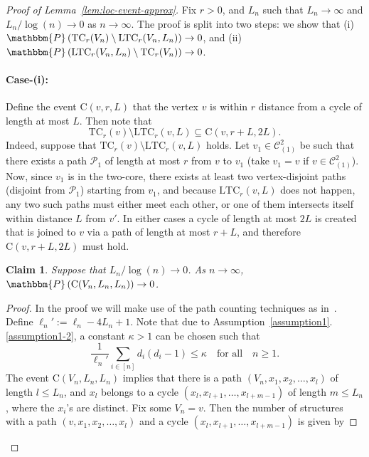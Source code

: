 \documentclass[11pt,a4paper, reqno]{article}
\numberwithin{equation}{section}
\numberwithin{equation}{section}
\def\sss{\scriptscriptstyle}
\newcommand{\prob}[1]{\ensuremath{\mathbbm{P}\left(#1\right)}}
\newcommand{\1}{\ensuremath{\mathbbm{1}}}
\newcommand{\TC}{\mathrm{TC}}
\newcommand{\LTC}{\mathrm{LTC}}
\newtheorem{claim}{Claim}
\newenvironment{claimproof}{\begin{proof}\renewcommand{\qedsymbol}{\claimqed}}{\end{proof}\renewcommand{\qedsymbol}{\plainqed}}
\let\plainqed\qedsymbol
\newcommand{\claimqed}{$\lrcorner$}
\numberwithin{equation}{section}
\numberwithin{theorem}{section}
\begin{document}
\begin{proof}[{Proof of Lemma~\ref{lem:loc-event-approx}}]
Fix $r>0$, and $L_n$ such that $L_n\to\infty$ and $L_n/\log(n)\to 0$ as $n\to\infty.$
The proof is split into two steps: we show that
(i) $\prob{\TC_r(V_n)\setminus \LTC_r(V_n,L_n)} \to 0$, and
(ii)~$\prob{\LTC_r(V_n,L_n)\setminus \TC_r(V_n)} \to 0$.
\paragraph*{Case-(i):} Define the event $\mathrm{C}(v,r,L)$ that the vertex $v$ is within $r$ distance from a cycle of length at most $L$.
Then note that 
$$\mathrm{TC}_r(v)\setminus \mathrm{LTC}_r(v,L)\subseteq \mathrm{C}(v,r+L,2L).$$
Indeed, suppose that $\mathrm{TC}_r(v)\setminus \mathrm{LTC}_r(v,L)$ holds. 
Let $v_1\in \mathscr{C}_{\sss (1)}^2$ be such that there exists a path $\mathcal{P}_1$ of length at most $r$ from $v$ to $v_1$ (take $v_1 = v$ if $v\in \mathscr{C}_{\sss (1)}^2$). 
Now, since $v_1$ is in the two-core, there exists at least two vertex-disjoint paths (disjoint from $\mathcal{P}_1$) starting from $v_1$, and because $\mathrm{LTC}_r(v,L)$ does not happen, any two such paths must either  meet each other, or one of them intersects itself within distance $L$ from $v'$. 
In either cases a cycle of length at most $2L$ is created that is joined to $v$ via a path of length at most $r+L$, and therefore $\mathrm{C}(v,r+L,2L)$ must hold.
\begin{claim}\label{claim:not-close-short-cycle} 
Suppose that $L_n/\log(n) \to 0$. As $n\to\infty$,  
$\prob{\mathrm{C}(V_n,L_n,L_n)}\to 0$.
\end{claim}
\begin{claimproof}
In the proof we will make use of the path counting techniques as in~\cite{J09b, BDHS17}.
 Define $\ell_n':=\ell_n-4L_n+1$. 
 Note that due to Assumption~\ref{assumption1}.\ref{assumption1-2}, a constant $\kappa >1$ can be chosen such that 
\begin{equation}\label{eq:choice-k}
\frac{1}{\ell_n'}\sum_{i\in [n]}d_i(d_i-1)\leq \kappa \quad\mbox{for all}\quad n\geq 1.
\end{equation}
 The event $\mathrm{C}(V_n,L_n,L_n)$ implies that there is a path $(V_n, x_1,x_2,\ldots, x_{l})$ of length $l \leq L_n$, and $x_{l}$ belongs to a cycle $(x_{l},x_{l+1},\ldots,x_{l+m-1})$ of length $m\leq L_n$, where the $x_i$'s are distinct.
 Fix some $V_n=v$.
Then the number of structures with a path $(v, x_1,x_2,\ldots, x_l)$ and a cycle $(x_l,x_{l+1},\ldots,x_{l+m-1})$ is given by

\end{claimproof}
\end{proof}
\end{document}
